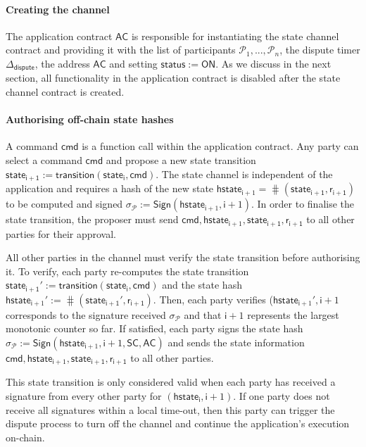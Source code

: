 \documentclass{llncs}
\newcommand{\chanstatus}{\mathsf{status}}
\newcommand{\chanon}{\mathsf{ON}}
\newcommand{\cmd}{\mathsf{cmd}}
\newcommand{\hstatei}{\mathsf{hstate}_{\monotoniccounter}}
\newcommand{\hstateplus}{\ensuremath{\mathsf{hstate}_{\monotoniccounter+1}}}
\newcommand{\monotoniccounter}{\mathsf{i}}
\newcommand{\stateinfoi}{\mathsf{state}_{\mathsf{i}}}
\newcommand{\stateinfoplus}{\mathsf{state}_{\mathsf{i+1}}}
\newcommand{\participant}{\mathcal{P}}
\newcommand{\ranplus}{\mathsf{r}_{\mathsf{i+1}}}
\newcommand{\statechannel}{\mathsf{SC}}
\newcommand{\sign}{\mathsf{Sign}}
\newcommand{\appcontract}{\mathsf{AC}}
\newcommand{\timerdispute}{\mathsf{\Delta}_{\mathsf{dispute}}}
\begin{document}
\paragraph{Creating the channel} 

The application contract $\appcontract$ is responsible for instantiating the state channel contract and providing it with the list of participants $\participant_{1},...,\participant_{n}$, the dispute timer $\timerdispute$, the address $\appcontract$ and setting $\chanstatus := \chanon$. 
As we discuss in the next section, all functionality in the application contract is disabled after the state channel contract is created. 

\paragraph{Authorising off-chain state hashes}
A command $\cmd$ is a function call within the application contract.
Any party can select a command $\cmd$ and propose a new state transition $\stateinfoplus := \mathsf{transition}(\stateinfoi, \cmd)$.
The state channel is independent of the application and requires a hash of the new state  $\hstateplus = \hash(\stateinfoplus, \ranplus)$ to be computed and signed  $\sigma_{\participant} := \sign(\hstateplus,\monotoniccounter+1)$.
In order to finalise the state transition, the proposer  must send $\cmd,\hstateplus, \stateinfoplus, \ranplus$ to all other parties for their approval.

All other parties in the channel must verify the state transition before authorising it. 
To verify, each party re-computes the state transition $\stateinfoplus' := \mathsf{transition}(\stateinfoi, \cmd)$ and the state hash $\hstateplus' := \hash(\stateinfoplus', \ranplus)$.
Then, each party verifies  ($\hstateplus', \monotoniccounter+1$ corresponds to the signature received $\sigma_{\participant}$ and that $\monotoniccounter+1$ represents the largest monotonic counter so far. 
If satisfied, each party signs the state hash  $\sigma_{\participant} := \sign(\hstateplus,\monotoniccounter+1, \statechannel, \appcontract)$ and sends the state information  $\cmd,\hstateplus, \stateinfoplus, \ranplus$ to all other parties. 

This state transition is only considered valid when each party has received a signature from every other party for $(\hstatei, \monotoniccounter+1)$. If one party does not receive all signatures within a local time-out, then this party can trigger the dispute process to turn off the channel and continue the application's execution on-chain. 
\end{document}
